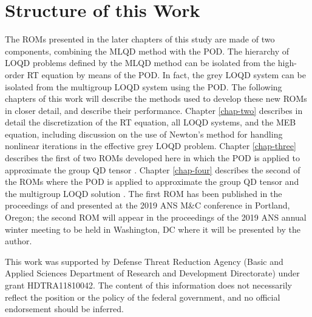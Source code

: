 \section{Structure of this Work} \label{sec:loqd-pod_roms}
	The ROMs presented in the later chapters of this study are made of two components, combining the MLQD method with the POD. The hierarchy of LOQD problems defined by the MLQD method can be isolated from the high-order RT equation by means of the POD. In fact, the grey LOQD system can be isolated from the multigroup LOQD system using the POD. The following chapters of this work will describe the methods used to develop these new ROMs in closer detail, and describe their performance. Chapter \ref{chap-two} describes in detail the discretization of the RT equation, all LOQD systems, and the MEB equation, including discussion on the use of Newton's method for handling nonlinear iterations in the effective grey LOQD problem. Chapter \ref{chap-three} describes the first of two ROMs developed here in which the POD is applied to approximate the group QD tensor \cite{jc-dya-m&c2019}. Chapter \ref{chap-four} describes the second of the ROMs where the POD is applied to approximate the group QD tensor and the multigroup LOQD solution \cite{jc-dya-tans2019}. The first ROM has been published in the proceedings of and presented at the 2019 ANS M\&C conference in Portland, Oregon; the second ROM will appear in the proceedings of the 2019 ANS annual winter meeting to be held in Washington, DC where it will be presented by the author.
	
	\ind This work was supported by Defense Threat Reduction Agency (Basic and Applied Sciences Department of Research and Development Directorate) under grant HDTRA11810042. The content of this information does not necessarily reflect the position or the policy of the federal government, and no official endorsement should be inferred.